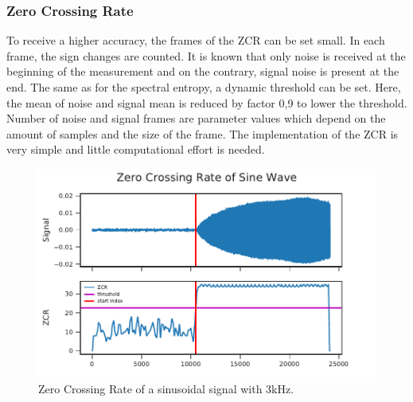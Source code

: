 
\subsubsection*{Zero Crossing Rate}

To receive a higher accuracy, the frames of the \ac{ZCR} can be set small.
In each frame, the sign changes are counted.
It is known that only noise is received at the beginning of the measurement and on the
contrary, signal noise is present at the end.
The same as for the spectral entropy, a dynamic threshold can be set.
Here, the mean of noise and signal mean is reduced by factor 0,9 to
lower the threshold.
Number of noise and signal frames are parameter values which depend
on the amount of samples and the size of the frame.
The implementation of the \ac{ZCR} is very simple and little
computational effort is needed.

\begin{figure}[ht]
	\centering
		\includegraphics[]{figures/sine_zcr}
	\caption{Zero Crossing Rate of a sinusoidal signal with 3\si{\kilo\hertz}.}
	\label{fig:03_zcr}
\end{figure}